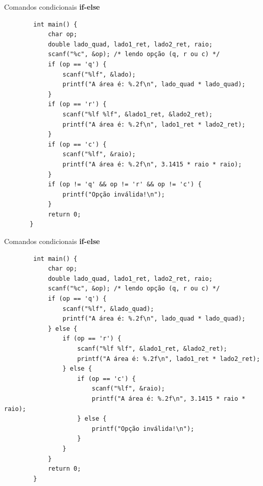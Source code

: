 \documentclass[handout]{beamer}
\begin{document}
\begin{frame}[fragile]{Comandos condicionais {\bf if-else}}
   \vspace{-1em}
    \begin{verbatim}
        int main() {
            char op;
            double lado_quad, lado1_ret, lado2_ret, raio;
            scanf("%c", &op); /* lendo opção (q, r ou c) */
            if (op == 'q') {
                scanf("%lf", &lado);
                printf("A área é: %.2f\n", lado_quad * lado_quad);
            }
            if (op == 'r') {
                scanf("%lf %lf", &lado1_ret, &lado2_ret);
                printf("A área é: %.2f\n", lado1_ret * lado2_ret);
            }
            if (op == 'c') {
                scanf("%lf", &raio);
                printf("A área é: %.2f\n", 3.1415 * raio * raio);
            }
            if (op != 'q' && op != 'r' && op != 'c') {
                printf("Opção inválida!\n");
            }
            return 0;
       }
    \end{verbatim}
\end{frame}

\begin{frame}[fragile]{Comandos condicionais  {\bf if-else}}
    \begin{verbatim}
        int main() {
            char op;
            double lado_quad, lado1_ret, lado2_ret, raio;
            scanf("%c", &op); /* lendo opção (q, r ou c) */
            if (op == 'q') {
                scanf("%lf", &lado_quad);
                printf("A área é: %.2f\n", lado_quad * lado_quad);
            } else {
                if (op == 'r') {
                    scanf("%lf %lf", &lado1_ret, &lado2_ret);
                    printf("A área é: %.2f\n", lado1_ret * lado2_ret);
                } else {
                    if (op == 'c') {
                        scanf("%lf", &raio);
                        printf("A área é: %.2f\n", 3.1415 * raio * raio);
                    } else {
                        printf("Opção inválida!\n");
                    }
                }
            }
            return 0;
        }
    \end{verbatim}
\end{frame}
\end{document}
